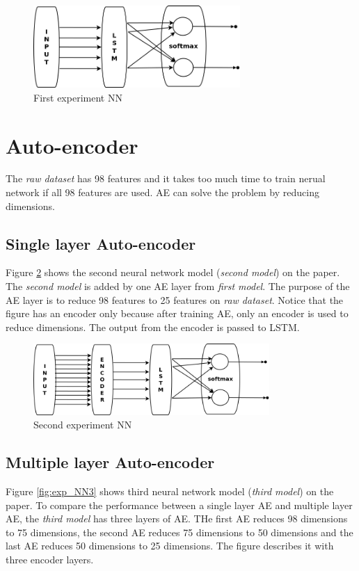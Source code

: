 \documentclass[draft,dvipsnames]{drexel-thesis}
\begin{document}
\begin{thesis}
\begin{figure}[t!]
    \centering
    \includegraphics[width=0.7\textwidth]{pictures/figures/exp_NN1.png}
    \caption{First experiment NN}
    \label{fig:exp_NN1}
\end{figure}


\section{Auto-encoder}
The {\em raw dataset} has 98 features and it takes too much time to train nerual network if all 98 features are used. AE can solve the problem by reducing dimensions.

\subsection{Single layer Auto-encoder}
Figure \ref{fig:exp_NN2} shows the second neural network model ({\em second model}) on the paper. The {\em second model} is added by one AE layer from {\em first model}. The purpose of the AE layer is to reduce 98 features to 25 features on {\em raw dataset}. Notice that the figure has an encoder only because after training AE, only an encoder is used to reduce dimensions. The output from the encoder is passed to LSTM.

\begin{figure}[t!]
    \centering
    \includegraphics[width=0.8\textwidth]{pictures/figures/exp_NN2.png}
    \caption{Second experiment NN}
    \label{fig:exp_NN2}
\end{figure}


\subsection{Multiple layer Auto-encoder}
Figure \ref{fig:exp_NN3} shows third neural network model ({\em third model}) on the paper. To compare the performance between a single layer AE and multiple layer AE, the {\em third model} has three layers of AE.  THe first AE reduces 98 dimensions to 75 dimensions, the second AE reduces 75 dimensions to 50 dimensions and the last AE reduces 50 dimensions to 25 dimensions. The figure describes it with three encoder layers.


\end{thesis}
\end{document}
